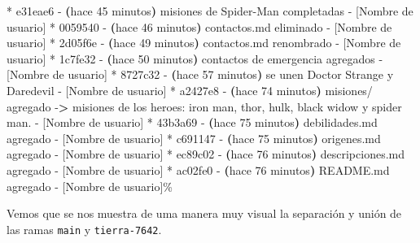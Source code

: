 \documentclass[
]{book}
\newenvironment{Shaded}{\begin{snugshade}}{\end{snugshade}}
\newcommand{\AttributeTok}[1]{\textcolor[rgb]{0.13,0.29,0.53}{#1}}
\newcommand{\ErrorTok}[1]{\textcolor[rgb]{0.64,0.00,0.00}{\textbf{#1}}}
\newcommand{\ExtensionTok}[1]{#1}
\newcommand{\KeywordTok}[1]{\textcolor[rgb]{0.13,0.29,0.53}{\textbf{#1}}}
\newcommand{\NormalTok}[1]{#1}
\newcommand{\OperatorTok}[1]{\textcolor[rgb]{0.81,0.36,0.00}{\textbf{#1}}}
\begin{document}
\begin{Shaded}
\begin{Highlighting}[]
\ExtensionTok{*}\NormalTok{ e31eae6 }\AttributeTok{{-}} \ErrorTok{(}\ExtensionTok{hace}\NormalTok{ 45 minutos}\KeywordTok{)} \ExtensionTok{misiones}\NormalTok{ de Spider{-}Man completadas }\AttributeTok{{-}}\NormalTok{ [Nombre de usuario]}
\ExtensionTok{*}\NormalTok{ 0059540 }\AttributeTok{{-}} \ErrorTok{(}\ExtensionTok{hace}\NormalTok{ 46 minutos}\KeywordTok{)} \ExtensionTok{contactos.md}\NormalTok{ eliminado }\AttributeTok{{-}}\NormalTok{ [Nombre de usuario]}
\ExtensionTok{*}\NormalTok{ 2d05f6e }\AttributeTok{{-}} \ErrorTok{(}\ExtensionTok{hace}\NormalTok{ 49 minutos}\KeywordTok{)} \ExtensionTok{contactos.md}\NormalTok{ renombrado }\AttributeTok{{-}}\NormalTok{ [Nombre de usuario]}
\ExtensionTok{*}\NormalTok{ 1c7fe32 }\AttributeTok{{-}} \ErrorTok{(}\ExtensionTok{hace}\NormalTok{ 50 minutos}\KeywordTok{)} \ExtensionTok{contactos}\NormalTok{ de emergencia agregados }\AttributeTok{{-}}\NormalTok{ [Nombre de usuario]}
\ExtensionTok{*}\NormalTok{ 8727c32 }\AttributeTok{{-}} \ErrorTok{(}\ExtensionTok{hace}\NormalTok{ 57 minutos}\KeywordTok{)} \ExtensionTok{se}\NormalTok{ unen Doctor Strange y Daredevil }\AttributeTok{{-}}\NormalTok{ [Nombre de usuario]}
\ExtensionTok{*}\NormalTok{ a2427e8 }\AttributeTok{{-}} \ErrorTok{(}\ExtensionTok{hace}\NormalTok{ 74 minutos}\KeywordTok{)} \ExtensionTok{misiones/}\NormalTok{ agregado }\AttributeTok{{-}}\OperatorTok{\textgreater{}}\NormalTok{ misiones de los heroes: iron man, thor, hulk, black widow y spider man. }\AttributeTok{{-}}\NormalTok{ [Nombre de usuario]}
\ExtensionTok{*}\NormalTok{ 43b3a69 }\AttributeTok{{-}} \ErrorTok{(}\ExtensionTok{hace}\NormalTok{ 75 minutos}\KeywordTok{)} \ExtensionTok{debilidades.md}\NormalTok{ agregado }\AttributeTok{{-}}\NormalTok{ [Nombre de usuario]}
\ExtensionTok{*}\NormalTok{ c691147 }\AttributeTok{{-}} \ErrorTok{(}\ExtensionTok{hace}\NormalTok{ 75 minutos}\KeywordTok{)} \ExtensionTok{origenes.md}\NormalTok{ agregado }\AttributeTok{{-}}\NormalTok{ [Nombre de usuario]}
\ExtensionTok{*}\NormalTok{ ec89c02 }\AttributeTok{{-}} \ErrorTok{(}\ExtensionTok{hace}\NormalTok{ 76 minutos}\KeywordTok{)} \ExtensionTok{descripciones.md}\NormalTok{ agregado }\AttributeTok{{-}}\NormalTok{ [Nombre de usuario]}
\ExtensionTok{*}\NormalTok{ ac02fe0 }\AttributeTok{{-}} \ErrorTok{(}\ExtensionTok{hace}\NormalTok{ 76 minutos}\KeywordTok{)} \ExtensionTok{README.md}\NormalTok{ agregado }\AttributeTok{{-}}\NormalTok{ [Nombre de usuario]\%     }
\end{Highlighting}
\end{Shaded}

Vemos que se nos muestra de uma manera muy visual la separación y unión de las ramas \texttt{main} y \texttt{tierra-7642}.
\end{document}
